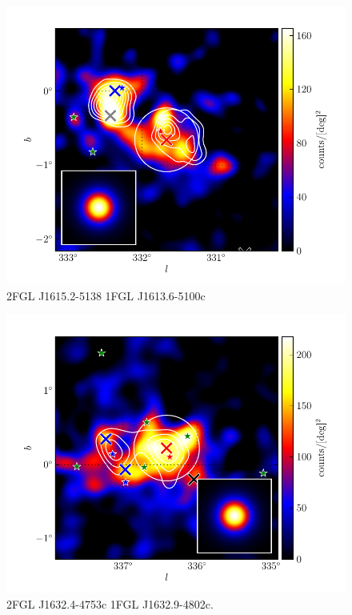 \documentclass[12pt,preprint]{aastex}
\begin{document}
\begin{figure}
  \begin{center}
    \includegraphics[type=pdf,ext=.pdf,read=.pdf]{source_plots/source_1FGL_J1613.6-5100c}
  \end{center}
  \caption{
2FGL J1615.2-5138
1FGL J1613.6-5100c
  }\label{1FGL_J1613.6-5100c}
\end{figure}

\begin{figure}
  \begin{center}
    \includegraphics[type=pdf,ext=.pdf,read=.pdf]{source_plots/source_1FGL_J1632.9-4802c}
  \end{center}
  \caption{
2FGL J1632.4-4753c
1FGL J1632.9-4802c. 
  }\label{1FGL_J1632.9-4802c}
\end{figure}
\end{document}
